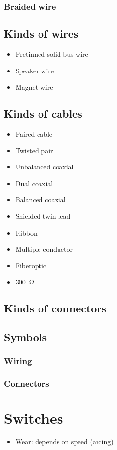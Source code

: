 \documentclass{report}
\begin{document}
\subsubsection{Braided wire}
\subsection{Kinds of wires}
\begin{itemize}
\item Pretinned solid bus wire
\item Speaker wire
\item Magnet wire
\end{itemize}
\subsection{Kinds of cables}
\begin{itemize}
\item Paired cable
\item Twisted pair
\item Unbalanced coaxial
\item Dual coaxial
\item Balanced coaxial
\item Shielded twin lead
\item Ribbon
\item Multiple conductor
\item Fiberoptic
\item \SI{300}{\ohm}
\end{itemize}
\subsection{Kinds of connectors}
\subsection{Symbols}
\subsubsection{Wiring}
\subsubsection{Connectors}
\section{Switches}
\begin{itemize}
\item Wear: depends on speed (arcing)
\end{itemize}
\end{document}
